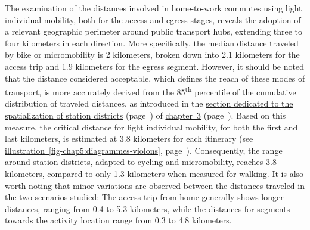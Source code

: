 \begin{refsegment}
The examination of the distances involved in home-to-work commutes using light individual mobility, both for the access and egress stages, reveals the adoption of a relevant geographic perimeter around public transport hubs, extending three to four kilometers in each direction. More specifically, the median distance traveled by bike or micromobility is 2 kilometers, broken down into 2.1 kilometers for the access trip and 1.9 kilometers for the egress segment. However, it should be noted that the distance considered acceptable, which defines the reach of these modes of transport, is more accurately derived from the 85\textsuperscript{th} percentile of the cumulative distribution of traveled distances, as introduced in the \hyperref[chap3:quartiers-gare-distances]{section dedicated to the spatialization of station districts} (page~\pageref{chap3:quartiers-gare-distances}) of \hyperref[chap3:titre]{chapter~3} (page~\pageref{chap3:titre}). Based on this measure, the critical distance for light individual mobility, for both the first and last kilometers, is estimated at 3.8 kilometers for each \gls{itinerary} (see \hyperref[fig-chap5:diagrammes-violons]{illustration~\ref{fig-chap5:diagrammes-violons}}, page~\pageref{fig-chap5:diagrammes-violons}). Consequently, the range around station districts, adapted to cycling and micromobility, reaches 3.8 kilometers, compared to only 1.3 kilometers when measured for walking. It is also worth noting that minor variations are observed between the distances traveled in the two scenarios studied: The access trip from home generally shows longer distances, ranging from 0.4 to 5.3 kilometers, while the distances for segments towards the activity location range from 0.3 to 4.8 kilometers.%


\end{refsegment}
